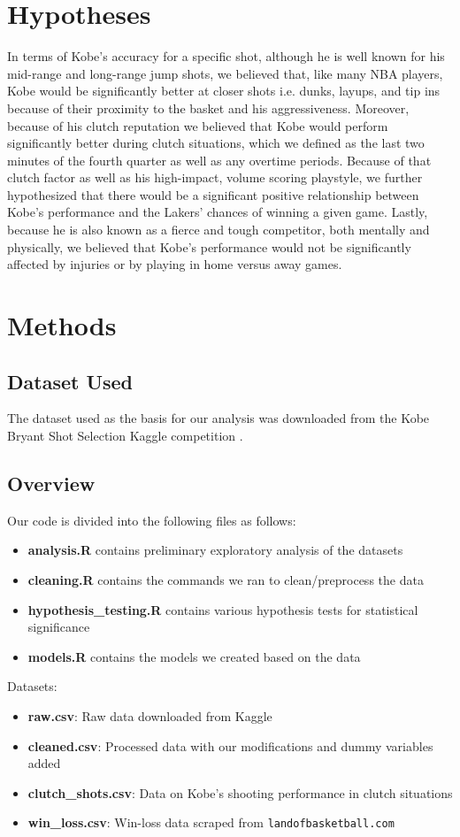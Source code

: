 \documentclass[paper=a4, fontsize=11pt]{scrartcl} %
\numberwithin{equation}{section} %
\numberwithin{figure}{section} %
\numberwithin{table}{section} %
\begin{document}
\section{Hypotheses}
\hspace*{1cm}In terms of Kobe's accuracy for a specific shot, although he is well known for his mid-range and long-range jump shots, we believed that, like many NBA players, Kobe would be significantly better at closer shots i.e. dunks, layups, and tip ins because of their proximity to the basket and his aggressiveness. Moreover, because of his clutch reputation we believed that Kobe would perform significantly better during clutch situations, which we defined as the last two minutes of the fourth quarter as well as any overtime periods. Because of that clutch factor as well as his high-impact, volume scoring playstyle, we further hypothesized that there would be a significant positive relationship between Kobe's performance and the Lakers' chances of winning a given game. Lastly, because he is also known as a fierce and tough competitor, both mentally and physically, we believed that Kobe's performance would not be significantly affected by injuries or by playing in home versus away games.
\section{Methods}
	\subsection{Dataset Used}
	\hspace*{1cm}The dataset used as the basis for our analysis was downloaded from the Kobe Bryant Shot Selection Kaggle competition \cite{kagglecompetition}.
	\subsection{Overview}
	Our code is divided into the following files as follows:
		\begin{itemize}
			\item \textbf{analysis.R} contains preliminary exploratory analysis of the datasets
			\item \textbf{cleaning.R} contains the commands we ran to clean/preprocess the data
			\item \textbf{hypothesis\_testing.R} contains various hypothesis tests for statistical significance
			\item \textbf{models.R} contains the models we created based on the data
		\end{itemize}
	Datasets:
		\begin{itemize}
			\item \textbf{raw.csv}: Raw data downloaded from Kaggle
			\item \textbf{cleaned.csv}: Processed data with our modifications and dummy variables added
			\item \textbf{clutch\_shots.csv}: Data on Kobe's shooting performance in clutch situations
			\item \textbf{win\_loss.csv}: Win-loss data scraped from \texttt{landofbasketball.com}
		\end{itemize}
\end{document}
